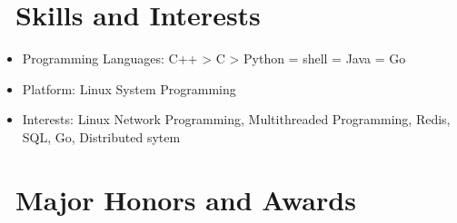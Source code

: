\documentclass{resume}
\begin{document}
\section{\faCogs\ Skills and Interests}
\begin{itemize}[parsep=0.5ex]
  \item Programming Languages: C++ > C > Python = shell = Java = Go
  \item Platform: Linux System Programming
  \item Interests: Linux Network Programming, Multithreaded Programming, Redis, SQL, Go, Distributed sytem
\end{itemize}

\section{\faHeartO\ Major Honors and Awards}
\end{document}
